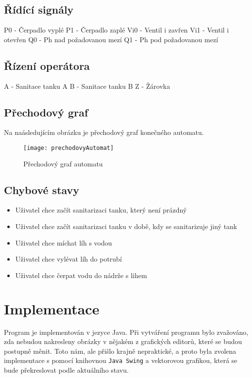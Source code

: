 \documentclass[12pt, a4paper]{article}
\begin{document}
\subsection{Řídící signály}
P0 - Čerpadlo vyplé \newline 
P1 - Čerpadlo zaplé \newline 
Vi0 - Ventil i zavřen \newline 
Vi1 - Ventil i otevřen \newline 
Q0 - Ph nad požadovanou mezí \newline 
Q1 - Ph pod požadovanou mezí 

\subsection{Řízení operátora}
A - Sanitace tanku A \newline 
B - Sanitace tanku B \newline 
Z - Žárovka

\subsection{Přechodový graf}
Na naásledujícím obrázku je přechodový graf konečného automatu.
\begin{figure}[h]
\centering 
\texttt{[image: prechodovyAutomat]}
\caption{Přechodový graf automatu}
\end{figure}

\subsection{Chybové stavy} \label{chyba}
\begin{itemize}
  \item Uživatel chce začít sanitarizaci tanku, který není prázdný
  \item Uživatel chce začít sanitarizaci tanku v době, kdy se sanitarizuje jiný tank
  \item Uživatel chce míchat líh s vodou
  \item Uživatel chce vylévat líh do potrubí
  \item Uživatel chce čerpat vodu do nádrže s lihem
\end{itemize}

\section{Implementace}
Program je implementován v jezyce Java. Při vytváření programu bylo zvažováno, zda nebudou nakresleny obrázky v nějakém z grafických editorů, které se budou postupně měnit. Toto nám, ale přišlo krajně nepraktické, a proto byla zvolena implementace s pomocí knihovnou \texttt{Java Swing} a vektorovou grafikou, která se bude překreslovat podle aktuálního stavu. 
\end{document}
